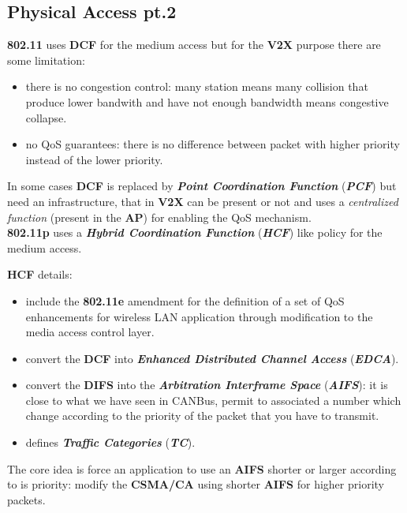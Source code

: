 \subsection{Physical Access pt.2}
\textbf{802.11} uses \textbf{DCF} for the medium access but for the \textbf{V2X} purpose there are some limitation:
\begin{itemize}[nosep]
    \item there is no congestion control: many station means many collision that produce lower bandwith and have not enough bandwidth means congestive collapse.
    \item no QoS guarantees: there is no difference between packet with higher priority instead of the lower priority.
\end{itemize}
In some cases \textbf{DCF} is replaced by \textbf{\textit{Point Coordination Function}} (\textbf{\textit{PCF}}) but need an infrastructure, that in \textbf{V2X} can be present or not and uses a \textit{centralized function} (present in the \textbf{AP}) for enabling the QoS mechanism. \\ \newline
\textbf{802.11p} uses a \textbf{\textit{Hybrid Coordination Function}} (\textbf{\textit{HCF}}) like policy for the medium access. 
\begin{boxA}
    \textbf{HCF} details:
    \begin{itemize}[nosep]
        \item include the \textbf{802.11e} amendment for the definition of a set of QoS enhancements for wireless LAN application through modification to the media access control layer.
        \item convert the \textbf{DCF} into \textbf{\textit{Enhanced Distributed Channel Access}} (\textbf{\textit{EDCA}}).
        \item convert the \textbf{DIFS} into the \textbf{\textit{Arbitration Interframe Space}} (\textbf{\textit{AIFS}}): it is close to what we have seen in CANBus, permit to associated a number which change according to the priority of the packet that you have to transmit.
        \item defines \textbf{\textit{Traffic Categories}} (\textbf{\textit{TC}}).
    \end{itemize}
\end{boxA}
The core idea is force an application to use an \textbf{AIFS} shorter or larger according to is priority: modify the \textbf{CSMA/CA} using shorter \textbf{AIFS} for higher priority packets.
